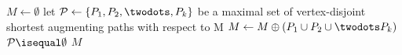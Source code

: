 \begin{codebox}
\li $M \gets \emptyset$
\li \Repeat
\li let $\mathcal{P} \gets \{P_1,P_2, \twodots ,P_k\}$ be a maximal set of vertex-disjoint
\zi shortest augmenting paths with respect to M
\li $M \gets M \oplus (P_1 \cup P_2 \cup  \twodots  P_k)$
\li \Until $\mathcal{P} \isequal \emptyset$
\li \Return $M$
\end{codebox}